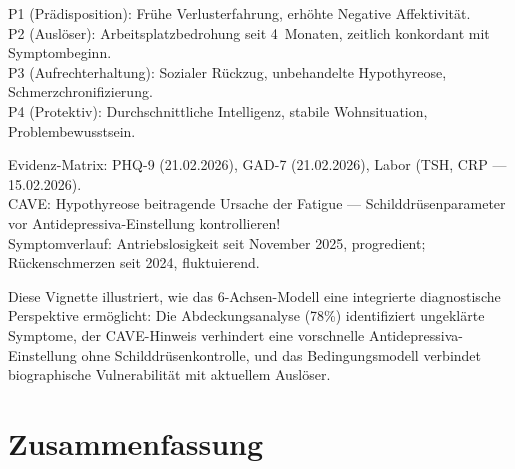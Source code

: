 \documentclass[11pt,a4paper]{article}
\begin{document}
\begin{description}[style=nextline, leftmargin=1.5cm, font=\bfseries\small]
P1 (Pr\"adisposition): Fr\"uhe Verlusterfahrung, erh\"ohte Negative Affektivit\"at. \\
P2 (Ausl\"oser): Arbeitsplatzbedrohung seit 4~Monaten, zeitlich konkordant mit Symptombeginn. \\
P3 (Aufrechterhaltung): Sozialer R\"uckzug, unbehandelte Hypothyreose, Schmerzchronifizierung. \\
P4 (Protektiv): Durchschnittliche Intelligenz, stabile Wohnsituation, Problembewusstsein.
\item[Achse~VI (Belegsammlung)]
Evidenz-Matrix: PHQ-9 (21.02.2026), GAD-7 (21.02.2026), Labor (TSH, CRP --- 15.02.2026). \\
CAVE: Hypothyreose beitragende Ursache der Fatigue --- Schilddr\"usenparameter vor Antidepressiva-Einstellung kontrollieren! \\
Symptomverlauf: Antriebslosigkeit seit November 2025, progredient; R\"uckenschmerzen seit 2024, fluktuierend.
\end{description}

\noindent Diese Vignette illustriert, wie das 6-Achsen-Modell eine integrierte diagnostische Perspektive erm\"oglicht: Die Abdeckungsanalyse (78\%) identifiziert ungekl\"arte Symptome, der CAVE-Hinweis verhindert eine vorschnelle Antidepressiva-Einstellung ohne Schilddr\"usenkontrolle, und das Bedingungsmodell verbindet biographische Vulnerabilit\"at mit aktuellem Ausl\"oser.


\section{Zusammenfassung}
\label{sec:zusammenfassung}
\end{document}
